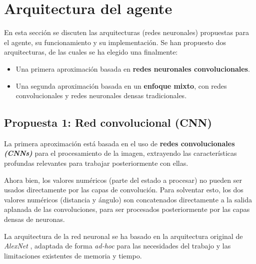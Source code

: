 \section{Arquitectura del agente}

En esta sección se discuten las arquitecturas (redes neuronales) propuestas para el agente, su funcionamiento y su implementación. Se han propuesto dos arquitecturas, de las cuales se ha elegido una finalmente:

\begin{itemize}
		\item Una primera aproximación basada en \textbf{redes neuronales convolucionales}.
		\item Una segunda aproximación basada en un \textbf{enfoque mixto}, con redes convolucionales y redes neuronales densas tradicionales.
\end{itemize}

\subsection{Propuesta 1: Red convolucional (CNN)}

La primera aproximación está basada en el uso de \textbf{redes convolucionales \textit{(CNNs)}} para el procesamiento de la imagen, extrayendo las características profundas relevantes para trabajar posteriormente con ellas. 

Ahora bien, los valores numéricos (parte del estado a procesar) no pueden ser usados directamente por las capas de convolución. Para solventar esto, los dos valores numéricos (distancia y ángulo) son concatenados directamente a la salida aplanada de las convoluciones, para ser procesados posteriormente por las capas densas de neuronas.

La arquitectura de la red neuronal se ha basado en la arquitectura original de \textit{AlexNet} \cite{Krizhevsky2012ImageNetCW}, adaptada de forma \textit{ad-hoc} para las necesidades del trabajo y las limitaciones existentes de memoria y tiempo.

